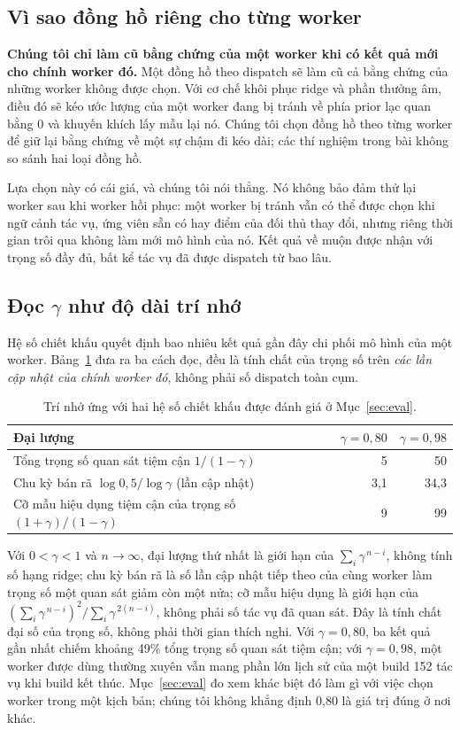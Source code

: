 \documentclass[final,5p,times,twocolumn]{elsarticle}
\begin{document}
\subsection{Vì sao đồng hồ riêng cho từng worker}
\label{sec:clock}

\textbf{Chúng tôi chỉ làm cũ bằng chứng của một worker khi có kết quả mới cho chính worker đó.} Một đồng hồ theo dispatch sẽ làm cũ cả bằng chứng của những worker không được chọn. Với cơ chế khôi phục ridge và phần thưởng âm, điều đó sẽ kéo ước lượng của một worker đang bị tránh về phía prior lạc quan bằng 0 và khuyến khích lấy mẫu lại nó. Chúng tôi chọn đồng hồ theo từng worker để giữ lại bằng chứng về một sự chậm đi kéo dài; các thí nghiệm trong bài không so sánh hai loại đồng hồ.

Lựa chọn này có cái giá, và chúng tôi nói thẳng. Nó không bảo đảm thử lại worker sau khi worker hồi phục: một worker bị tránh vẫn có thể được chọn khi ngữ cảnh tác vụ, ứng viên sẵn có hay điểm của đối thủ thay đổi, nhưng riêng thời gian trôi qua không làm mới mô hình của nó. Kết quả về muộn được nhận với trọng số đầy đủ, bất kể tác vụ đã được dispatch từ bao lâu.

\subsection{Đọc $\gamma$ như độ dài trí nhớ}

Hệ số chiết khấu quyết định bao nhiêu kết quả gần đây chi phối mô hình của một worker. Bảng~\ref{tab:memory} đưa ra ba cách đọc, đều là tính chất của trọng số trên \emph{các lần cập nhật của chính worker đó}, không phải số dispatch toàn cụm.

\begin{table}[t]
\centering
\caption{Trí nhớ ứng với hai hệ số chiết khấu được đánh giá ở Mục~\ref{sec:eval}.}
\label{tab:memory}
\footnotesize
\begin{tabular}{@{}p{5.2cm}rr@{}}
\toprule
Đại lượng & $\gamma=0{,}80$ & $\gamma=0{,}98$ \\
\midrule
Tổng trọng số quan sát tiệm cận $1/(1-\gamma)$ & 5 & 50 \\
Chu kỳ bán rã $\log 0{,}5/\log\gamma$ (lần cập nhật) & 3,1 & 34,3 \\
Cỡ mẫu hiệu dụng tiệm cận của trọng số $(1+\gamma)/(1-\gamma)$ & 9 & 99 \\
\bottomrule
\end{tabular}
\end{table}

Với $0<\gamma<1$ và $n\to\infty$, đại lượng thứ nhất là giới hạn của $\sum_i\gamma^{\,n-i}$, không tính số hạng ridge; chu kỳ bán rã là số lần cập nhật tiếp theo của cùng worker làm trọng số một quan sát giảm còn một nửa; cỡ mẫu hiệu dụng là giới hạn của $(\sum_i\gamma^{\,n-i})^2/\sum_i\gamma^{\,2(n-i)}$, không phải số tác vụ đã quan sát. Đây là tính chất đại số của trọng số, không phải thời gian thích nghi. Với $\gamma=0{,}80$, ba kết quả gần nhất chiếm khoảng 49\% tổng trọng số quan sát tiệm cận; với $\gamma=0{,}98$, một worker được dùng thường xuyên vẫn mang phần lớn lịch sử của một build 152 tác vụ khi build kết thúc. Mục~\ref{sec:eval} đo xem khác biệt đó làm gì với việc chọn worker trong một kịch bản; chúng tôi không khẳng định 0,80 là giá trị đúng ở nơi khác.
\end{document}
